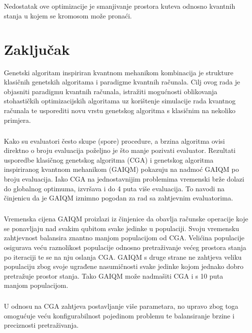 \documentclass[times, utf8, zavrsni, numeric]{fer}
\begin{document}
\paragraph{}
Nedostatak ove optimizacije je smanjivanje prostora kuteva odnosno kvantnih stanja u kojem se kromosom može pronaći.

\chapter{Zaključak} 
\label{ch:zaključak}
Genetski algoritam inspiriran kvantnom mehanikom kombinacija je strukture klasičnih genetskih algoritama i paradigme kvantnih računala. Cilj ovog rada je objasniti paradigmu kvantnih računala, istražiti mogućnosti oblikovanja stohastičkih optimizacijskih algoritama uz korištenje simulacije rada kvantnog računala te usporediti novu vrstu genetskog algoritma s klasičnim na nekoliko primjera.

\paragraph{}
Kako su evaluatori često skupe (spore) procedure, a brzina algoritma ovisi direktno o broju evaluacija poželjno je što manje pozivati evaluator. Rezultati usporedbe klasičnog genetskog algoritma (CGA) i genetskog algoritma inspiriranog kvantnom mehanikom (GAIQM) pokazuju na nadmoć GAIQM po broju evaluacija. Iako CGA na jednostavnijim problemima vremenski brže dolazi do globalnog optimuma, izvršava i do 4 puta više evaluacija. To navodi na činjenicu da je GAIQM iznimno pogodan za rad sa zahtjevnim evaluatorima.

\paragraph{}
Vremenska cijena GAIQM proizlazi iz činjenice da obavlja računske operacije koje se ponavljaju nad svakim qubitom svake jedinke u populaciji. Svoju vremensku zahtjevnost balansira znantno manjom populacijom od CGA. Velićina populacije osigurava veću raznolikost populacije odnosno pretraživanje većeg prostora stanja po iteraciji te se na nju oslanja CGA. GAIQM s druge strane ne zahtjeva veliku populaciju zbog svoje ugrađene nasumičnosti svake jedinke kojom jednako dobro pretražuje prostor stanja. Tako GAIQM može nadmašiti CGA i s 10 puta manjom populacijom.

\paragraph{}
U odnosu na CGA zahtjeva postavljanje više parametara, no upravo zbog toga omogućuje veću konfigurabilnost pojedinom problemu te balansiranje brzine i preciznosti pretraživanja.
\end{document}
